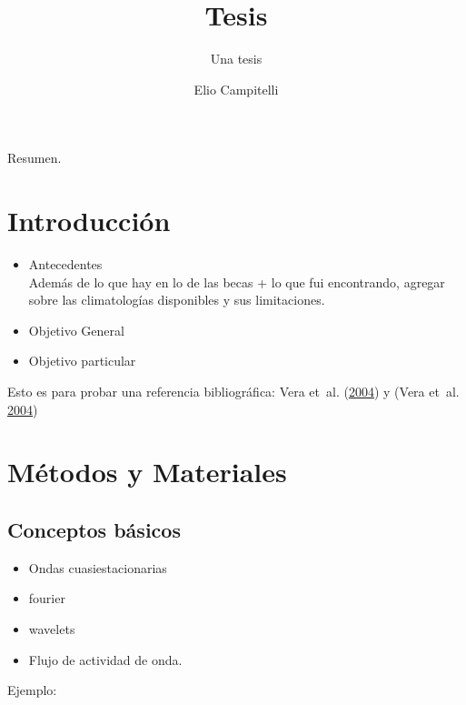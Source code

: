 \documentclass[spanish,a4paper]{book}
\title{Tesis}
\subtitle{Una tesis}
\author{Elio Campitelli}
\date{}
\providecommand{\tightlist}{%
  \setlength{\itemsep}{0pt}\setlength{\parskip}{0pt}}
\begin{document}
\maketitle

{
\setcounter{tocdepth}{3}
\tableofcontents
}
Resumen.


\chapter{Introducción}\label{introduccion}

\begin{itemize}
\tightlist
\item
  Antecedentes\\
  Además de lo que hay en lo de las becas + lo que fui encontrando,
  agregar sobre las climatologías disponibles y sus limitaciones.
\item
  Objetivo General
\item
  Objetivo particular
\end{itemize}

Esto es para probar una referencia bibliográfica: Vera et~al.
(\protect\hyperlink{ref-Vera2004}{2004}) y (Vera et~al.
\protect\hyperlink{ref-Vera2004}{2004})

\chapter{Métodos y Materiales}\label{metodos-y-materiales}


\section{Conceptos básicos}\label{conceptos-basicos}

\begin{itemize}
\tightlist
\item
  Ondas cuasiestacionarias
\item
  fourier
\item
  wavelets
\item
  Flujo de actividad de onda.
\end{itemize}


Ejemplo:
\end{document}

